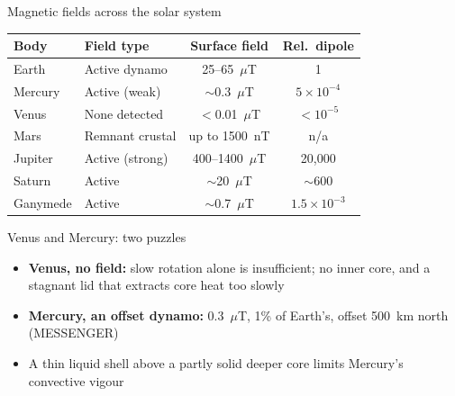 \documentclass[aspectratio=169, 11pt]{beamer}
\begin{document}
\begin{frame}{Magnetic fields across the solar system}
  \centering
  \small
  \begin{tabular}{l l c c}
    \toprule
    \textbf{Body} & \textbf{Field type} & \textbf{Surface field} & \textbf{Rel.\ dipole} \\
    \midrule
    Earth     & Active dynamo    & 25--65~$\mu$T  & 1 \\
    Mercury   & Active (weak)    & $\sim$0.3~$\mu$T & $5 \times 10^{-4}$ \\
    Venus     & None detected    & $<$0.01~$\mu$T & $<10^{-5}$ \\
    Mars      & Remnant crustal  & up to 1500~nT  & n/a \\
    Jupiter   & Active (strong)  & 400--1400~$\mu$T & 20,000 \\
    Saturn    & Active           & $\sim$20~$\mu$T & $\sim$600 \\
    Ganymede  & Active           & $\sim$0.7~$\mu$T & $1.5 \times 10^{-3}$ \\
    \bottomrule
  \end{tabular}
  \vskip8pt
\end{frame}

\begin{frame}
\end{frame}

\begin{frame}
\end{frame}

\begin{frame}{Venus and Mercury: two puzzles}
  \begin{itemize}\setlength\itemsep{4pt}
    \item \textbf{Venus, no field:} slow rotation alone is insufficient; no inner core, and a stagnant lid that extracts core heat too slowly
    \item \textbf{Mercury, an offset dynamo:} 0.3~$\mu$T, 1\% of Earth's, offset 500~km north (MESSENGER)
    \item A thin liquid shell above a partly solid deeper core limits Mercury's convective vigour
  \end{itemize}
  \vskip8pt
\end{frame}
\end{document}
